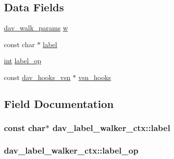 \subsection*{Data Fields}
\begin{DoxyCompactItemize}
\item 
\hyperlink{structdav__walk__params}{dav\+\_\+walk\+\_\+params} \hyperlink{structdav__label__walker__ctx_ad51a8378c1a9265ae4d915656660c93a}{w}
\item 
const char $\ast$ \hyperlink{structdav__label__walker__ctx_a5bec7f16c3fecf8566ed0c6a0a2b41ea}{label}
\item 
\hyperlink{pcre_8txt_a42dfa4ff673c82d8efe7144098fbc198}{int} \hyperlink{structdav__label__walker__ctx_a8d99f25eb4665491628c45e94dfc2ba1}{label\+\_\+op}
\item 
const \hyperlink{structdav__hooks__vsn}{dav\+\_\+hooks\+\_\+vsn} $\ast$ \hyperlink{structdav__label__walker__ctx_a8bc4f91d58592ba54acfb1ab64e9d5c2}{vsn\+\_\+hooks}
\end{DoxyCompactItemize}


\subsection{Field Documentation}
\subsubsection[{\texorpdfstring{label}{label}}]{\setlength{\rightskip}{0pt plus 5cm}const char$\ast$ dav\+\_\+label\+\_\+walker\+\_\+ctx\+::label}\hypertarget{structdav__label__walker__ctx_a5bec7f16c3fecf8566ed0c6a0a2b41ea}{}\label{structdav__label__walker__ctx_a5bec7f16c3fecf8566ed0c6a0a2b41ea}
\subsubsection[{\texorpdfstring{label\+\_\+op}{label_op}}]{ dav\+\_\+label\+\_\+walker\+\_\+ctx\+::label\+\_\+op}\hypertarget{structdav__label__walker__ctx_a8d99f25eb4665491628c45e94dfc2ba1}{}\label{structdav__label__walker__ctx_a8d99f25eb4665491628c45e94dfc2ba1}

